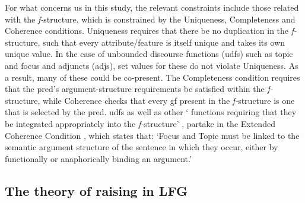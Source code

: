 \documentclass[output=paper]{LSP/langsci}
\begin{document}

For what concerns us in this study, the relevant constraints include those related with the \emph{f-}structure, which is constrained by the Uniqueness, Completeness and Coherence conditions. Uniqueness requires that there be no duplication in the \emph{f-}structure, such that every attribute/feature is itself unique and takes its own unique value. In the case of unbounded discourse functions ({\sc udf}s) such as {\sc top}ic and {\sc foc}us and adjuncts ({\sc adj}s), set values for these do not violate Uniqueness. As a result, many of these could be co-present. The Completeness condition requires that the {\sc pred}'s argument-structure requirements be satisfied within the \emph{f-}structure, while Coherence checks that every {\sc gf} present in the \emph{f-}structure is one that is selected by the {\sc pred}. {\sc udf}s as well as other ` functions requiring that they be integrated appropriately into the \emph{f-}structure' , partake in the Extended Coherence Condition , which states that: `Focus and Topic must be linked to the semantic  argument structure of the sentence in which they occur, either by functionally or anaphorically binding an argument.'

\subsection{The theory of raising in {LFG}}
\end{document}

